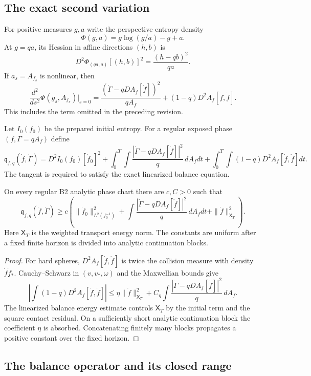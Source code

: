 \subsection{The exact second variation}

For positive measures $g,a$ write the perspective entropy density
\[
 \Phi(g,a)=g\log(g/a)-g+a.
\]
At $g=qa$, its Hessian in affine directions $(h,b)$ is
\[
 D^2\Phi_{(qa,a)}[(h,b)]^2
 =\frac{(h-qb)^2}{qa}.
\]
If $a_s=A_{f_s}$ is nonlinear, then
\[
 \frac{d^2}{ds^2}\Phi(g_s,A_{f_s})\bigg|_{s=0}
 =\frac{(\dot\Gamma-qDA_f[\dot f])^2}{qA_f}
 +(1-q)D^2A_f[\dot f,\dot f].
\]
This includes the term omitted in the preceding revision.

Let $I_0(f_0)$ be the prepared initial entropy.  For a regular exposed phase
$(f,\Gamma=qA_f)$ define
\[
 \mathfrak q_{f,q}(\dot f,\dot\Gamma)=
 D^2I_0(f_0)[\dot f_0]^2
 +\int_0^T\int
  \frac{|\dot\Gamma-qDA_f[\dot f]|^2}{q}\,dA_fdt
 +\int_0^T\int(1-q)D^2A_f[\dot f,\dot f]dt.
\]
The tangent is required to satisfy the exact linearized balance equation.

\begin{lemma}
\label{lem:r7-b3-coercive}
On every regular B2 analytic phase chart there are $c,C>0$ such that
\[
 \mathfrak q_{f,q}(\dot f,\dot\Gamma)
 \ge c\left(
 \|\dot f_0\|_{L^2(f_0^{-1})}^2
 +\int\frac{|\dot\Gamma-qDA_f[\dot f]|^2}{q}\,dA_fdt
 +\|\dot f\|_{\mathsf X_T}^2\right).
\]
Here $\mathsf X_T$ is the weighted transport energy norm.  The constants are
uniform after a fixed finite horizon is divided into analytic continuation
blocks.
\end{lemma}

\begin{proof}
For hard spheres,
$D^2A_f[\dot f,\dot f]$ is twice the collision measure with density
$\dot f\dot f_*$.  Cauchy--Schwarz in $(v,v_*,\omega)$ and the Maxwellian
bounds give
\[
 \left|\int(1-q)D^2A_f[\dot f,\dot f]\right|
 \le \eta\|\dot f\|_{\mathsf X_T}^2
 +C_\eta\int
  \frac{|\dot\Gamma-qDA_f[\dot f]|^2}{q}\,dA_f.
\]
The linearized balance energy estimate controls $\mathsf X_T$ by the initial
term and the square contact residual.  On a sufficiently short analytic
continuation block the coefficient $\eta$ is absorbed.  Concatenating finitely
many blocks propagates a positive constant over the fixed horizon.
\end{proof}

\subsection{The balance operator and its closed range}

